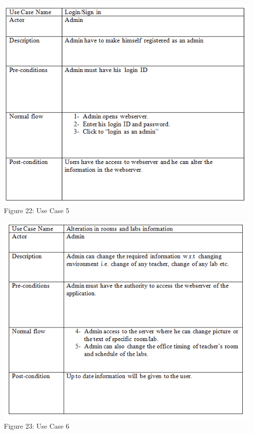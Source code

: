 \documentclass{article}
\begin{document}
\begin{center}
\includegraphics[scale=0.77]{uc5}
\\Figure 22: Use Case 5
\end{center}
\begin{center}
\includegraphics[scale=0.75]{uc6}
\\Figure 23: Use Case 6
\end{center}
\end{document}
